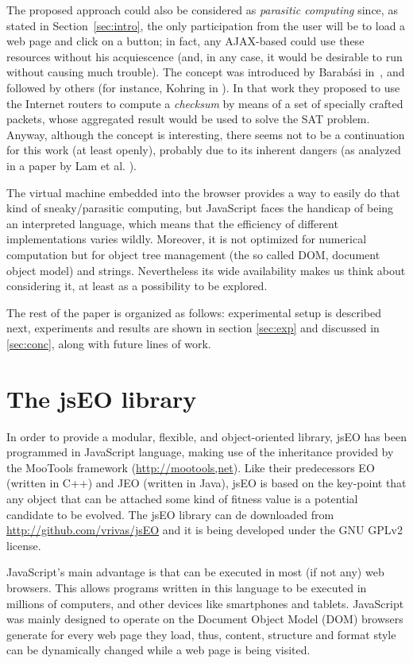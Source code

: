 \documentclass[runningheads,a4paper]{llncs}
\begin{document}
The proposed approach could also be considered as {\em parasitic
computing} since, as stated in Section~\ref{sec:intro}, the only
participation from the user will be to load a web page and click on a
button; in fact, any AJAX-based could use these resources without his
acquiescence (and, in any case, it would be desirable to run without
causing much trouble).  The concept was introduced by Barab\'asi
in~\cite{Barabasi2001Parasitic}, and followed by others (for instance,
Kohring in \cite{kohring-2003-14}).  In that work they proposed to use
the Internet routers to compute a {\em checksum} by means of a set of
specially crafted packets, whose aggregated result would be used to
solve the SAT problem. Anyway, although the concept is interesting,
there seems not to be a continuation for this work (at least openly),
probably due to its inherent dangers (as analyzed in a paper by Lam et
al.  \cite{puppetnets}).

The virtual machine embedded into the browser provides a way to easily
do that kind of  sneaky/parasitic computing, but JavaScript faces the
handicap of being an interpreted language, which means that the efficiency of different
implementations varies wildly. Moreover, it is not optimized for
numerical computation but for object tree 
management (the so called DOM, document
object model) and strings.
Nevertheless its wide availability makes us think about considering it, at
least as a possibility to be explored.

The rest of the paper is organized as follows: experimental setup is described next,  experiments and results are shown in section 
\ref{sec:exp} and discussed in \ref{sec:conc}, along with future lines
of work. 

\section{The jsEO library}
\label{sec:jseo}
In order to provide a modular, flexible, and object-oriented library, jsEO has been programmed in JavaScript language, making use of the inheritance provided by the MooTools framework (\url{http://mootools,net}). Like their predecessors EO (written in C++) and JEO (written in Java), jsEO is based on the key-point that any object that can be attached some kind of fitness value is a potential candidate to be evolved. The jsEO library can de downloaded from \url{http://github.com/vrivas/jsEO} and it is being developed under the GNU GPLv2 license.

JavaScript's main advantage is that can be executed in most (if not any) web browsers. This allows programs written in this language to be executed in millions of computers, and other devices like smartphones and tablets. JavaScript was mainly designed to operate on the Document Object Model (DOM) browsers generate for every web page they load, thus, content, structure and format style can be dynamically changed while a web page is being visited.
\end{document}
